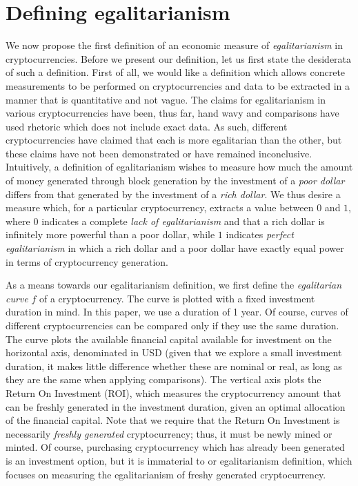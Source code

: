 \section{Defining egalitarianism}

We now propose the first definition of an economic measure of
\emph{egalitarianism} in cryptocurrencies. Before we present our definition, let
us first state the desiderata of such a definition. First of all, we would like
a definition which allows concrete measurements to be performed on
cryptocurrencies and data to be extracted in a manner that is quantitative and
not vague. The claims for egalitarianism in various cryptocurrencies have been,
thus far, hand wavy and comparisons have used rhetoric which does not include
exact data. As such, different cryptocurrencies have claimed that each is more
egalitarian than the other, but these claims have not been demonstrated or have
remained inconclusive. Intuitively, a definition of egalitarianism wishes to
measure how much the amount of money generated through block generation by the
investment of a \emph{poor dollar} differs from that generated by the investment
of a \emph{rich dollar}. We thus desire a measure which, for a particular
cryptocurrency, extracts a value between $0$ and $1$, where $0$ indicates a
complete \emph{lack of egalitarianism} and that a rich dollar is infinitely more
powerful than a poor dollar, while $1$ indicates \emph{perfect egalitarianism}
in which a rich dollar and a poor dollar have exactly equal power in terms of
cryptocurrency generation.

As a means towards our egalitarianism definition, we first define the
\emph{egalitarian curve} $f$ of a cryptocurrency. The curve is plotted with a
fixed investment duration in mind. In this paper, we use a duration of 1 year.
Of course, curves of different cryptocurrencies can be compared only if they
use the same duration. The curve plots the available financial capital available
for investment on the horizontal axis, denominated in USD (given that we explore
a small investment duration, it makes little difference whether these are
nominal or real, as long as they are the same when applying comparisons). The
vertical axis plots the Return On Investment (ROI), which measures the
cryptocurrency amount that can be freshly generated in the investment duration,
given an optimal allocation of the financial capital. Note that we require that
the Return On Investment is necessarily \emph{freshly generated} cryptocurrency;
thus, it must be newly mined or minted. Of course, purchasing cryptocurrency
which has already been generated is an investment option, but it is immaterial
to or egalitarianism definition, which focuses on measuring the egalitarianism
of freshy generated cryptocurrency.

